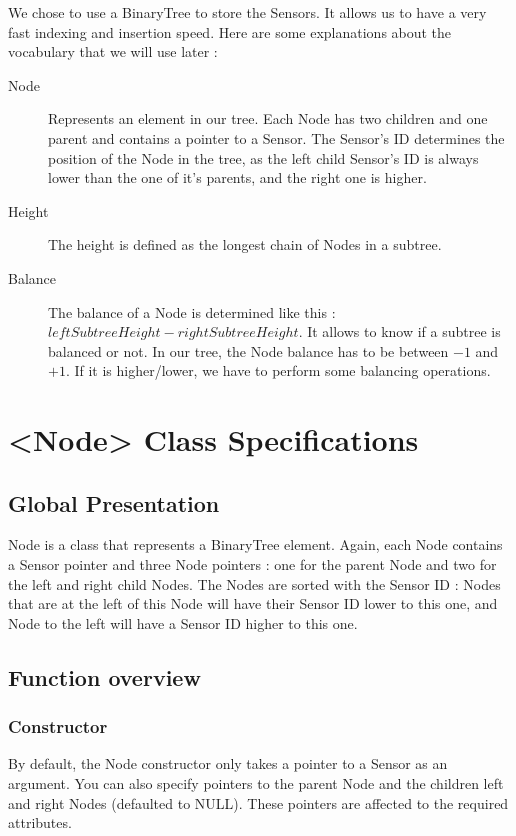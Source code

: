 \documentclass[10pt]{article}
\begin{document}
We chose to use a BinaryTree to store the Sensors. It allows us to have a very fast indexing and insertion speed.
Here are some explanations about the vocabulary that we will use later :

\begin{description}
	\item[Node] Represents an element in our tree. Each Node has two children and one parent and contains a pointer to a Sensor. The Sensor's ID determines the position of the Node in the tree, as the left child Sensor's ID is always lower than the one of it's parents, and the right one is higher.
	\item[Height] The height is defined as the longest chain of Nodes in a subtree.
	\item[Balance] The balance of a Node is determined like this : $ leftSubtreeHeight - rightSubtreeHeight$. It allows to know if a subtree is balanced or not. In our tree, the Node balance has to be between $-1$ and $+1$. If it is higher/lower, we have to perform some balancing operations.
\end{description}

\section{<Node> Class Specifications}
\subsection{Global Presentation}
Node is a class that represents a BinaryTree element. Again, each Node contains a Sensor pointer and three Node pointers : one for the parent Node and two for the left and right child Nodes. The Nodes are sorted with the Sensor ID : Nodes that are at the left of this Node will have their Sensor ID lower to this one, and Node to the left will have a Sensor ID higher to this one.

\subsection{Function overview}
\subsubsection*{Constructor}
By default, the Node constructor only takes a pointer to a Sensor as an argument. You can also specify pointers to the parent Node and the children left and right Nodes (defaulted to NULL). These pointers are affected to the required attributes.
\end{document}
